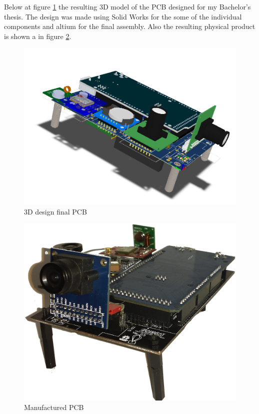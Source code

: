 \documentclass[letterpaper]{twentysecondcv-eng} %
\begin{document}
Below at figure \ref{fig:pcb} the resulting 3D model of the PCB designed for my Bachelor's thesis. The design was made using Solid Works for the some of the individual components and altium for the final assembly. Also the resulting physical product is shown a in figure \ref{fig:mpcb}.
\begin{figure}[h]
  \centering
  \includegraphics[scale = 0.5]{ortogonal_view}
  \caption{3D design final PCB}
  \label{fig:pcb}
\end{figure}
\begin{figure}[h]
  \centering
  \includegraphics[scale = 0.15]{final}
  \caption{Manufactured PCB}
  \label{fig:mpcb}
\end{figure}
\end{document}
